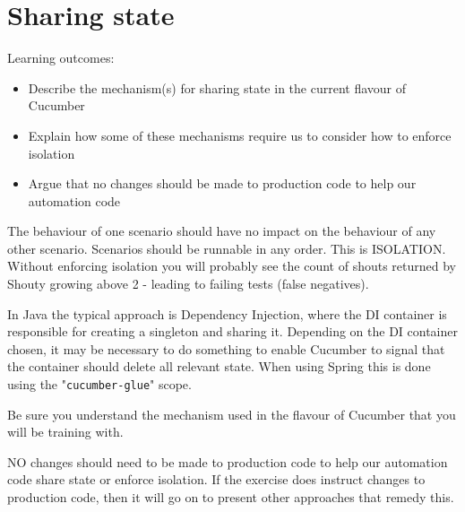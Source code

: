 \chapter*{Sharing state}

\ifnotes


    Learning outcomes:
    
    \begin{itemize}
        \item Describe the mechanism(s) for sharing state in the current flavour of Cucumber
        \item Explain how some of these mechanisms require us to consider how to enforce isolation
        \item Argue that no changes should be made to production code to help our automation code
    \end{itemize}
    
    The behaviour of one scenario should have no impact on the behaviour of any other scenario. Scenarios should be runnable in any order. This is ISOLATION. Without enforcing isolation you will probably see the count of shouts returned by Shouty growing above 2 - leading to failing tests (false negatives).
    
    In Java the typical approach is Dependency Injection, where the DI container is responsible for creating a singleton and sharing it. Depending on the DI container chosen, it may be necessary to do something to enable Cucumber to signal that the container should delete all relevant state. When using Spring this is done using the "\texttt{cucumber-glue}" scope. 

    Be sure you understand the mechanism used in the flavour of Cucumber that you will be training with.
    
    NO changes should need to be made to production code to help our automation code share state or enforce isolation. If the exercise does instruct changes to production code, then it will go on to present other approaches that remedy this.
\fi 

\ifcontent 
\fi